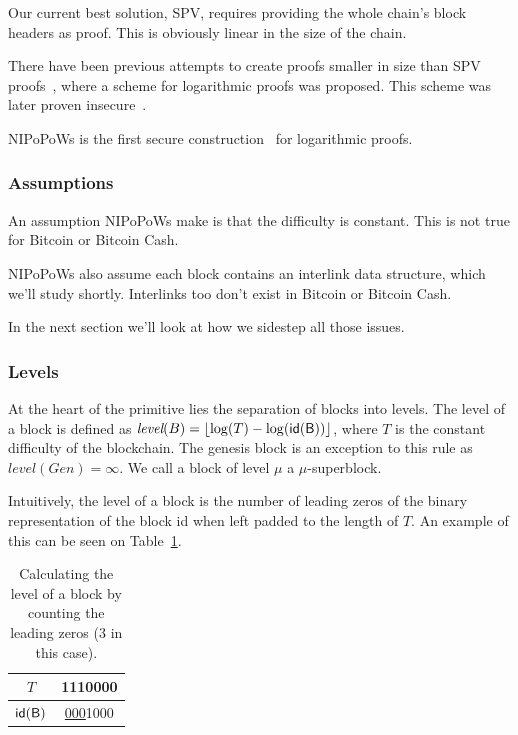 \documentclass[11pt]{llncs}
\begin{document}
Our current best solution, SPV, requires providing the whole chain's block
headers as proof. This is obviously linear in the size of the chain.

There have been previous attempts to create proofs smaller in size than SPV
proofs~\cite{KLS}, where a scheme for logarithmic proofs was proposed.
This scheme was later proven insecure~\cite{nipopows}.

NIPoPoWs is the first secure construction~\cite{nipopows} for logarithmic
proofs.

\subsubsection{Assumptions}
An assumption NIPoPoWs make is that the difficulty is constant. This is not
true for Bitcoin or Bitcoin Cash.

NIPoPoWs also assume each block contains an interlink data structure, which
we'll study shortly. Interlinks too don't exist in Bitcoin or Bitcoin Cash.

In the next section we'll look at how we sidestep all those issues.

\subsubsection{Levels}
At the heart of the primitive lies the separation of blocks into levels. The
level of a block is defined as $\textit{level}(B) = \left \lfloor \log(T) -
\log(\sf{id}(B)) \right \rfloor$, where $T$ is the constant difficulty of the
blockchain. The genesis block is an exception to this rule as
$\textit{level}(Gen) = \infty$. We call a block of level $\mu$ a $\mu$-superblock.

Intuitively, the level of a block is the number of leading zeros of the binary
representation of the block id when left padded to the length of $T$. An
example of this can be seen on Table~\ref{table:level-counting}.

\begin{table}
  \centering
  \begin{tabular}{|c|c|}
    \hline
    $T$ & 1110000 \\
    \hline
    $\sf{id}(B)$ & \underline{000}1000 \\
    \hline
  \end{tabular}
  \caption{Calculating the level of a block by counting the leading zeros (3 in this case).}
  \label{table:level-counting}
\end{table}
\end{document}

